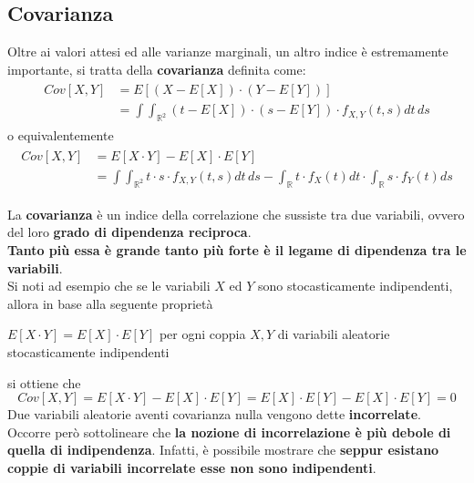 \subsection{Covarianza}
Oltre ai valori attesi ed alle varianze marginali, un altro indice è estremamente importante, si tratta della \textbf{covarianza} definita come:
\begin{align}
	\begin{split}
		Cov[X, Y] &= E[(X - E[X]) \cdot (Y - E[Y])] \\
		&= \int \int_{\mathbb{R}^2} (t - E[X]) \cdot (s - E[Y]) \cdot f_{X, Y} (t,s) dt \, ds
	\end{split}
\end{align}
o equivalentemente
\begin{align}
\begin{split}
Cov[X, Y] &= E[X \cdot Y] - E[X] \cdot E[Y]  \\
&= \int \int_{\mathbb{R}^2} t \cdot s \cdot  f_{X, Y} (t,s) dt \, ds - \int_{\mathbb{R}} t \cdot f_X(t) dt \cdot \int_{\mathbb{R}} s \cdot f_Y(t) ds
\end{split}
\end{align}

La \textbf{covarianza} è un indice della correlazione che sussiste tra due variabili, ovvero del loro \textbf{grado di dipendenza reciproca}.\\
\textbf{Tanto più essa è grande tanto più forte è il legame di dipendenza tra le variabili}.\\
Si noti ad esempio che se le variabili $X$ ed $Y$ sono stocasticamente indipendenti, allora in base alla seguente proprietà
\begin{center}
	$E[X \cdot Y] = E[X] \cdot E[Y]$ per ogni coppia $X, Y$ di variabili aleatorie stocasticamente indipendenti
\end{center}
si ottiene che
\[
Cov[X, Y] = E[X \cdot Y] - E[X] \cdot E[Y] = E[X] \cdot E[Y] - E[X] \cdot E[Y] = 0
\]
Due variabili aleatorie aventi covarianza nulla vengono dette \textbf{incorrelate}. \\
Occorre però sottolineare che \textbf{la nozione di incorrelazione è più debole di quella di indipendenza}.
Infatti, è possibile mostrare che \textbf{seppur esistano coppie di variabili incorrelate esse non sono indipendenti}.

